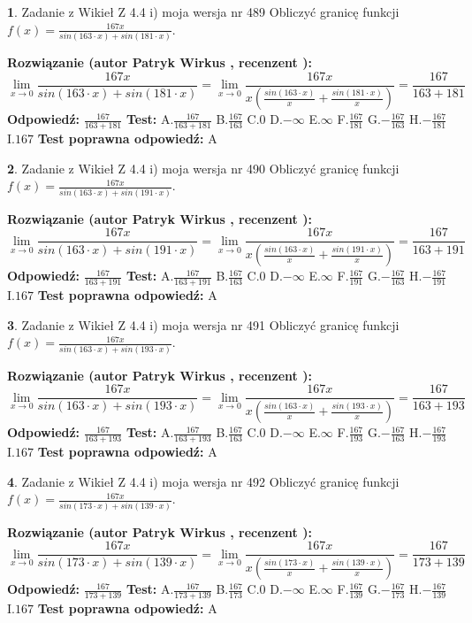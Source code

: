 \documentclass[12pt, a4paper]{article}
\theoremstyle{definition} %
\newtheorem{zad}{}
\newcommand{\zadStart}[1]{\begin{zad}#1\newline}
\newcommand{\zadStop}{\end{zad}}
\newcommand{\rozwStart}[2]{\noindent \textbf{Rozwiązanie (autor #1 , recenzent #2): }\newline}
\newcommand{\rozwStop}{\newline}
\newcommand{\odpStart}{\noindent \textbf{Odpowiedź:}\newline}
\newcommand{\odpStop}{\newline}
\newcommand{\testStart}{\noindent \textbf{Test:}\newline}
\newcommand{\testStop}{\newline}
\newcommand{\kluczStart}{\noindent \textbf{Test poprawna odpowiedź:}\newline}
\newcommand{\kluczStop}{\newline}
\begin{document}
\zadStart{Zadanie z Wikieł Z 4.4 i) moja wersja nr 489}
Obliczyć granicę funkcji $f(x)=\frac{167x}{sin(163\cdot x) +sin(181\cdot x)}$.
\zadStop
\rozwStart{Patryk Wirkus}{}
$$\lim\limits_{x\to 0}\frac{167x}{sin(163\cdot x) +sin(181\cdot x)}=\lim\limits_{x\to 0}\frac{167x}{x(\frac{sin(163\cdot x)}{x}+\frac{sin(181\cdot x)}{x})}=\frac{167}{163+181}$$
\rozwStop
\odpStart
$\frac{167}{163+181}$
\odpStop
\testStart
A.$\frac{167}{163+181}$
B.$\frac{167}{163}$
C.$0$
D.$-\infty$
E.$\infty$
F.$\frac{167}{181}$
G.$-\frac{167}{163}$
H.$-\frac{167}{181}$
I.$167$
\testStop
\kluczStart
A
\kluczStop



\zadStart{Zadanie z Wikieł Z 4.4 i) moja wersja nr 490}
Obliczyć granicę funkcji $f(x)=\frac{167x}{sin(163\cdot x) +sin(191\cdot x)}$.
\zadStop
\rozwStart{Patryk Wirkus}{}
$$\lim\limits_{x\to 0}\frac{167x}{sin(163\cdot x) +sin(191\cdot x)}=\lim\limits_{x\to 0}\frac{167x}{x(\frac{sin(163\cdot x)}{x}+\frac{sin(191\cdot x)}{x})}=\frac{167}{163+191}$$
\rozwStop
\odpStart
$\frac{167}{163+191}$
\odpStop
\testStart
A.$\frac{167}{163+191}$
B.$\frac{167}{163}$
C.$0$
D.$-\infty$
E.$\infty$
F.$\frac{167}{191}$
G.$-\frac{167}{163}$
H.$-\frac{167}{191}$
I.$167$
\testStop
\kluczStart
A
\kluczStop



\zadStart{Zadanie z Wikieł Z 4.4 i) moja wersja nr 491}
Obliczyć granicę funkcji $f(x)=\frac{167x}{sin(163\cdot x) +sin(193\cdot x)}$.
\zadStop
\rozwStart{Patryk Wirkus}{}
$$\lim\limits_{x\to 0}\frac{167x}{sin(163\cdot x) +sin(193\cdot x)}=\lim\limits_{x\to 0}\frac{167x}{x(\frac{sin(163\cdot x)}{x}+\frac{sin(193\cdot x)}{x})}=\frac{167}{163+193}$$
\rozwStop
\odpStart
$\frac{167}{163+193}$
\odpStop
\testStart
A.$\frac{167}{163+193}$
B.$\frac{167}{163}$
C.$0$
D.$-\infty$
E.$\infty$
F.$\frac{167}{193}$
G.$-\frac{167}{163}$
H.$-\frac{167}{193}$
I.$167$
\testStop
\kluczStart
A
\kluczStop



\zadStart{Zadanie z Wikieł Z 4.4 i) moja wersja nr 492}
Obliczyć granicę funkcji $f(x)=\frac{167x}{sin(173\cdot x) +sin(139\cdot x)}$.
\zadStop
\rozwStart{Patryk Wirkus}{}
$$\lim\limits_{x\to 0}\frac{167x}{sin(173\cdot x) +sin(139\cdot x)}=\lim\limits_{x\to 0}\frac{167x}{x(\frac{sin(173\cdot x)}{x}+\frac{sin(139\cdot x)}{x})}=\frac{167}{173+139}$$
\rozwStop
\odpStart
$\frac{167}{173+139}$
\odpStop
\testStart
A.$\frac{167}{173+139}$
B.$\frac{167}{173}$
C.$0$
D.$-\infty$
E.$\infty$
F.$\frac{167}{139}$
G.$-\frac{167}{173}$
H.$-\frac{167}{139}$
I.$167$
\testStop
\kluczStart
A
\kluczStop
\end{document}
